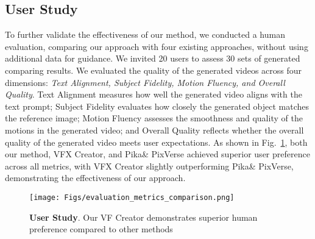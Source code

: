 \begin{table}[h]
\centering
\caption{Ablation results of different sample sizes during training across varying shot numbers.}
\renewcommand{\arraystretch}{0.8} %
\renewcommand{\arraystretch}{1} %
\label{tab:model_design_ablation}
\end{table}

\subsection{User Study}
To further validate the effectiveness of our method, we conducted a human evaluation, comparing our approach with four existing approaches, without using additional data for guidance. We invited 20 users to assess 30 sets of generated comparing results. We evaluated the quality of the generated videos across four dimensions: \emph{Text Alignment, Subject Fidelity, Motion Fluency, and Overall Quality}. Text Alignment measures how well the generated video aligns with the text prompt; Subject Fidelity evaluates how closely the generated object matches the reference image; Motion Fluency assesses the smoothness and quality of the motions in the generated video; and Overall Quality reflects whether the overall quality of the generated video meets user expectations. As shown in Fig.~\ref{fig:user_study}, both our method, VFX Creator, and Pika\& PixVerse achieved superior user preference across all metrics, with VFX Creator slightly outperforming Pika\& PixVerse, demonstrating the effectiveness of our approach.
\begin{figure}[htbp]
    \centering
    \texttt{[image: Figs/evaluation\_metrics\_comparison.png]} 
    \caption{\textbf{User Study}. Our VF Creator demonstrates superior human preference compared to other methods}
    \label{fig:user_study}
\end{figure}
